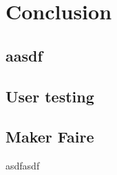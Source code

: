 \documentclass[../ClassicThesis.tex]{subfiles}
\begin{document}
\chapter{Conclusion}\label{ch:conclusion}

\section{aasdf}
\section{User testing}
\section{Maker Faire}

asdfasdf
\end{document}

